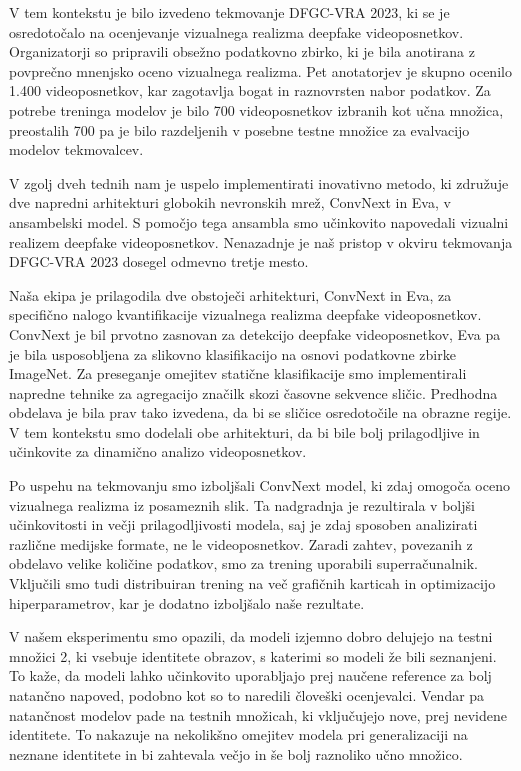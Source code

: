 \documentclass[a4paper,12pt,openright]{book}
\begin{document}
V tem kontekstu je bilo izvedeno tekmovanje DFGC-VRA 2023, ki se je osredotočalo na ocenjevanje vizualnega realizma deepfake videoposnetkov. Organizatorji so pripravili obsežno podatkovno zbirko, ki je bila anotirana z povprečno mnenjsko oceno vizualnega realizma. Pet anotatorjev je skupno ocenilo 1.400 videoposnetkov, kar zagotavlja bogat in raznovrsten nabor podatkov. Za potrebe treninga modelov je bilo 700 videoposnetkov izbranih kot učna množica, preostalih 700 pa je bilo razdeljenih v posebne testne množice za evalvacijo modelov tekmovalcev. 

V zgolj dveh tednih nam je uspelo implementirati inovativno metodo, ki združuje dve napredni arhitekturi globokih nevronskih mrež, ConvNext in Eva, v ansambelski model. S pomočjo tega ansambla smo učinkovito napovedali vizualni realizem deepfake videoposnetkov. Nenazadnje je naš pristop v okviru tekmovanja DFGC-VRA 2023 dosegel odmevno tretje mesto.

Naša ekipa je prilagodila dve obstoječi arhitekturi, ConvNext in Eva, za specifično nalogo kvantifikacije vizualnega realizma deepfake videoposnetkov. ConvNext je bil prvotno zasnovan za detekcijo deepfake videoposnetkov, Eva pa je bila usposobljena za slikovno klasifikacijo na osnovi podatkovne zbirke ImageNet.
Za preseganje omejitev statične klasifikacije smo implementirali napredne tehnike za agregacijo značilk skozi časovne sekvence sličic. Predhodna obdelava je bila prav tako izvedena, da bi se sličice osredotočile na obrazne regije. V tem kontekstu smo dodelali obe arhitekturi, da bi bile bolj prilagodljive in učinkovite za dinamično analizo videoposnetkov.

Po uspehu na tekmovanju smo izboljšali ConvNext model, ki zdaj omogoča oceno vizualnega realizma iz posameznih slik. Ta nadgradnja je rezultirala v boljši učinkovitosti in večji prilagodljivosti modela, saj je zdaj sposoben analizirati različne medijske formate, ne le videoposnetkov. 
Zaradi zahtev, povezanih z obdelavo velike količine podatkov, smo za trening uporabili superračunalnik. Vključili smo tudi distribuiran trening na več grafičnih karticah in optimizacijo hiperparametrov, kar je dodatno izboljšalo naše rezultate. 

V našem eksperimentu smo opazili, da modeli izjemno dobro delujejo na testni množici 2, ki vsebuje identitete obrazov, s katerimi so modeli že bili seznanjeni. To kaže, da modeli lahko učinkovito uporabljajo prej naučene reference za bolj natančno napoved, podobno kot so to naredili človeški ocenjevalci.
Vendar pa natančnost modelov pade na testnih množicah, ki vključujejo nove, prej nevidene identitete. To nakazuje na nekolikšno omejitev modela pri generalizaciji na neznane identitete in bi zahtevala večjo in še bolj raznoliko učno množico.
\end{document}
